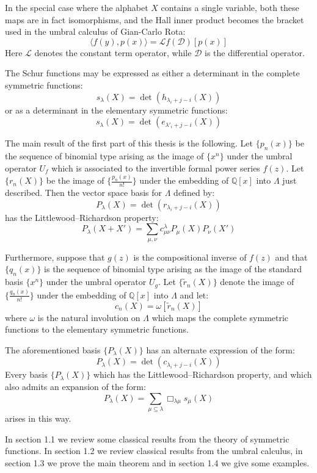 \documentclass[12pt,dvips]{amsart}
\begin{document}
In the special case where the alphabet $X$ contains a single variable, both these maps are in fact isomorphisms, and the Hall inner product becomes the bracket used in the umbral calculus of Gian-Carlo Rota:
$$ \langle f(y), p(x) \rangle = \mathcal{L}f(\mathcal{D})[p(x)] $$
Here $\mathcal{L}$ denotes the constant term operator, while $\mathcal{D}$ is the differential operator. 

The Schur functions may be expressed as either a determinant in the complete symmetric functions:
$$ s_\lambda(X) = \det( h_{\lambda_i + j - i}(X)) $$
or as a determinant in the elementary symmetric functions:
$$ s_\lambda(X) = \det( e_{\lambda'_i + j - i}(X)) $$



The main result of the first part of this thesis is the following. Let $\{p_n(x)\}$ be the sequence of binomial type arising as the image of $\{x^n\}$ under the umbral operator $U_f$ which is associated to the invertible formal power series $f(z)$. Let $\{r_n(X)\}$ be the image of $\{\frac{p_n(x)}{n!}\}$ under the embedding of $\mathbb{Q}[x]$ into $\Lambda$ just described. Then the vector space basis for $\Lambda$ defined by:
$$ P_\lambda(X) = \det( r_{\lambda_i + j - i}(X) ) $$
has the Littlewood--Richardson property:
$$ P_\lambda(X + X') = \sum_{\mu, \nu} c^{\lambda}_{\mu \nu} P_\mu(X) P_\nu(X') $$

Furthermore, suppose that $g(z)$ is the compositional inverse of $f(z)$ and that $\{q_n(x)\}$ is the sequence of binomial type arising as the image of the standard basis $\{x^n\}$ under the umbral operator $U_g$. Let $\{\tilde{r}_n(X)\}$ denote the image of $\{\frac{q_n(x)}{n!}\}$ under the embedding of $\mathbb{Q}[x]$ into $\Lambda$ and let:
$$c_n(X) = \omega[\tilde{r}_n(X)]$$
where $\omega$ is the natural involution on $\Lambda$ which maps the complete symmetric functions to the elementary symmetric functions. 

The aforementioned basis $\{P_\lambda(X)\}$ has an alternate expression of the form:
$$ P_\lambda(X) = \det( c_{\lambda_i + j - i}(X))$$
Every basis $\{P_\lambda(X)\}$ which has the Littlewood--Richardson property, and which also admits an expansion of the form:
$$ P_\lambda(X) = \sum_{\mu \subseteq \lambda} \Box_{\lambda \mu} s_\mu(X)$$
arises in this way.

In section 1.1 we review some classical results from the theory of symmetric functions. In section 1.2 we review classical results from the umbral calculus, in section 1.3 we prove the main theorem and in section 1.4 we give some examples.
\end{document}
